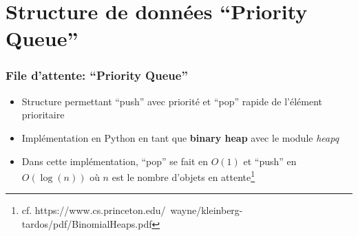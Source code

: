 \documentclass[]{beamer}
\begin{document}
\section{Structure de données ``Priority Queue''}
\begin{frame}
  \frametitle{File d'attente: ``Priority Queue''}
  \begin{itemize}
  \item Structure permettant ``push'' avec priorité et ``pop'' rapide de
    l'élément prioritaire
  \item Implémentation en Python en tant que \textbf{binary heap} avec le module \textit{heapq}
  \item Dans cette implémentation, ``pop'' se fait en $O(1)$ et ``push'' 
    en $O\left(\log(n)\right)$ où $n$ est le nombre d'objets en attente\footnote{cf. https://www.cs.princeton.edu/~wayne/kleinberg-tardos/pdf/BinomialHeaps.pdf}
  \end{itemize}
\end{frame}
\end{document}
